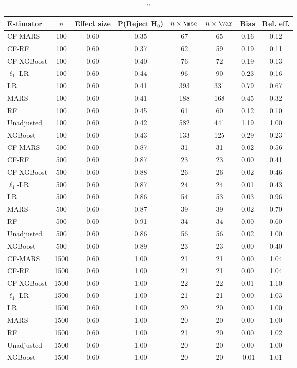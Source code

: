 \begin{table}
\centering
\caption{""}
\begin{tabular}{lccccccc}
\toprule
Estimator & $n$ & Effect size & P(Reject H$_0$) & $n\times\mse$ & $n\times \var$ & Bias & Rel. eff.\\ \midrule
CF-MARS & 100 & 0.60 & 0.35 &  67 &  65 &  0.16 & 0.12 \\ 
CF-RF & 100 & 0.60 & 0.37 &  62 &  59 &  0.19 & 0.11 \\ 
CF-XGBoost & 100 & 0.60 & 0.40 &  76 &  72 &  0.19 & 0.13 \\ 
$\ell_1$-LR & 100 & 0.60 & 0.44 &  96 &  90 &  0.23 & 0.16 \\ 
LR & 100 & 0.60 & 0.41 & 393 & 331 &  0.79 & 0.67 \\ 
MARS & 100 & 0.60 & 0.41 & 188 & 168 &  0.45 & 0.32 \\ 
RF & 100 & 0.60 & 0.45 &  61 &  60 &  0.12 & 0.10 \\ 
Unadjusted & 100 & 0.60 & 0.42 & 582 & 441 &  1.19 & 1.00 \\ 
XGBoost & 100 & 0.60 & 0.43 & 133 & 125 &  0.29 & 0.23 \\ \addlinespace 
CF-MARS & 500 & 0.60 & 0.87 &  31 &  31 &  0.02 & 0.56 \\ 
CF-RF & 500 & 0.60 & 0.87 &  23 &  23 &  0.00 & 0.41 \\ 
CF-XGBoost & 500 & 0.60 & 0.88 &  26 &  26 &  0.02 & 0.46 \\ 
$\ell_1$-LR & 500 & 0.60 & 0.87 &  24 &  24 &  0.01 & 0.43 \\ 
LR & 500 & 0.60 & 0.86 &  54 &  53 &  0.03 & 0.96 \\ 
MARS & 500 & 0.60 & 0.87 &  39 &  39 &  0.02 & 0.70 \\ 
RF & 500 & 0.60 & 0.91 &  34 &  34 &  0.00 & 0.60 \\ 
Unadjusted & 500 & 0.60 & 0.86 &  56 &  56 &  0.02 & 1.00 \\ 
XGBoost & 500 & 0.60 & 0.89 &  23 &  23 &  0.00 & 0.40 \\ \addlinespace 
CF-MARS & 1500 & 0.60 & 1.00 &  21 &  21 &  0.00 & 1.04 \\ 
CF-RF & 1500 & 0.60 & 1.00 &  21 &  21 &  0.00 & 1.04 \\ 
CF-XGBoost & 1500 & 0.60 & 1.00 &  22 &  22 &  0.01 & 1.10 \\ 
$\ell_1$-LR & 1500 & 0.60 & 1.00 &  21 &  21 &  0.00 & 1.03 \\ 
LR & 1500 & 0.60 & 1.00 &  20 &  20 &  0.00 & 1.00 \\ 
MARS & 1500 & 0.60 & 1.00 &  20 &  20 &  0.00 & 1.00 \\ 
RF & 1500 & 0.60 & 1.00 &  21 &  20 &  0.00 & 1.02 \\ 
Unadjusted & 1500 & 0.60 & 1.00 &  20 &  20 &  0.00 & 1.00 \\ 
XGBoost & 1500 & 0.60 & 1.00 &  20 &  20 & -0.01 & 1.01 \\
\bottomrule
\end{tabular}
\end{table}

